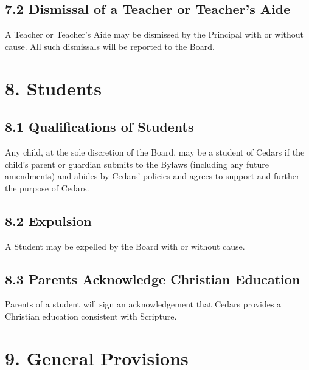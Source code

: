 \documentclass[
]{book}
\begin{document}
\subsection*{7.2 Dismissal of a Teacher or Teacher's Aide}\label{dismissal-of-a-teacher-or-teachers-aide}

A Teacher or Teacher's Aide may be dismissed by the Principal with or without cause. All such dismissals will be reported to the Board.

\section*{8. Students}\label{students}

\subsection*{8.1 Qualifications of Students}\label{qualifications-of-students}

Any child, at the sole discretion of the Board, may be a student of Cedars if the child's parent or guardian submits to the Bylaws (including any future amendments) and abides by Cedars' policies and agrees to support and further the purpose of Cedars.

\subsection*{8.2 Expulsion}\label{expulsion}

A Student may be expelled by the Board with or without cause.

\subsection*{8.3 Parents Acknowledge Christian Education}\label{parents-acknowledge-christian-education}

Parents of a student will sign an acknowledgement that Cedars provides a Christian education consistent with Scripture.

\section*{9. General Provisions}\label{general-provisions}
\end{document}
